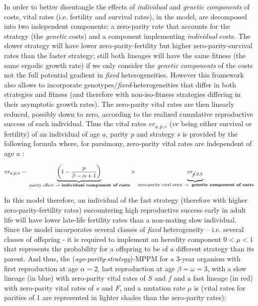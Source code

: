 \documentclass[10pt,a4paper]{article}
\begin{document}
In order to better disentangle the effects of \emph{individual} and \emph{genetic components} of costs, vital rates (i.e. fertility and survival rates), in the model, are decomposed into two independent components: a zero-parity rate that accounts for the strategy (the \emph{genetic} costs) and a component implementing  \emph{individual} costs.  The slower strategy will have lower zero-parity-fertility but higher zero-parity-survival rates than the faster strategy; still both lineages will have the same fitness (the same ergodic growth rate) if we only consider the \emph{genetic components} of the costs not the full potential gradient in \emph{fixed} heterogeneities. However this framework also allows to incorporate genotypes/\emph{fixed}-heterogeneities that differ in both strategies and fitness (and therefore with non-iso-fitness strategies differing in their asymptotic growth rates). The zero-parity vital rates are then linearly reduced, possibly down to zero, according to the realized cumulative reproductive success of each individual. 
Thus the vital rates $vr_{a,p,s}$ ($vr$ being either survival or fertility) of an individual of age $a$, parity $p$ and strategy $s$ is provided by the following formula where, for parsimony, zero-parity vital rates are independent of age $a$ :

\[vr_{a,p,s}= \underbrace{\left( 1-\frac{p}{\beta-\alpha+1}\right) }_{\text{ parity effect $\rightarrow$ \textbf{individual  component of costs}}}\times\underbrace{\vphantom{1-\frac{p}{\beta-\alpha+1})}vr_{\cancel{a},0,h}}_{\text{ zero-parity vital rates $\rightarrow$ \textbf{ genetic component of costs}}}
\]

In this model therefore, an individual of the fast strategy (therefore with higher zero-parity-fertility rates) encountering high reproductive success early in adult life will have lower late-life fertility rates than a non-mating slow individual.
Since the model incorporates several classes of \emph{fixed} heterogeneity – i.e. several classes of offspring - it is required to implement an heredity component $0<\mu<1$ that represents the probability for a offspring to be of a different strategy than its parent. 
And thus, the (\emph{age}-\emph{parity}-\emph{strategy})-MPPM for a 3-year organism with first reproduction at age $\alpha=2$, last reproduction at age $\beta=\omega=3$, with a slow lineage (in blue) with zero-parity vital rates of $S$ and $f$ and a fast lineage (in red) with zero-parity vital rates of $s$ and $F$, and a mutation rate $\mu$ is (vital rates for parities of 1 are represented in lighter shades than the zero-parity rates):
\end{document}
